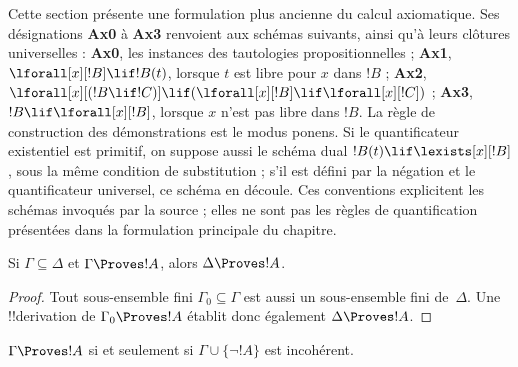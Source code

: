 \documentclass[../../../include/open-logic-section]{subfiles}
\begin{document}
      {}
      {}


\begin{editorial}
Cette section présente une formulation plus ancienne du calcul
axiomatique. Ses désignations \textbf{Ax0} à \textbf{Ax3} renvoient
aux schémas suivants, ainsi qu'à leurs clôtures universelles :
\textbf{Ax0}, les instances des tautologies propositionnelles ;
\textbf{Ax1}, $\lforall[x][!B]\lif !B(t)$, lorsque $t$ est libre
pour $x$ dans $!B$ ;
\textbf{Ax2},
$\lforall[x][(!B\lif !C)]\lif
(\lforall[x][!B]\lif\lforall[x][!C])$ ;
\textbf{Ax3}, $!B\lif\lforall[x][!B]$, lorsque $x$ n'est pas
libre dans $!B$. La règle de construction des démonstrations est
le modus ponens. Si le quantificateur existentiel est primitif,
on suppose aussi le schéma dual
$!B(t)\lif\lexists[x][!B]$, sous la même condition de
substitution ; s'il est défini par la négation et le quantificateur
universel, ce schéma en découle. Ces conventions explicitent
les schémas invoqués
par la source ; elles ne sont pas les règles de quantification
présentées dans la formulation principale du chapitre.
\end{editorial}

\begin{prop}[Monotonie]
Si $\Gamma \subseteq \Delta$ et $\Gamma \Proves !A$, alors
$\Delta \Proves !A$.
\end{prop}

\begin{proof}
Tout sous-ensemble fini $\Gamma_0 \subseteq \Gamma$ est aussi un
sous-ensemble fini de~$\Delta$. Une !!{derivation} de
$\Gamma_0 \Proves !A$ établit donc également
$\Delta \Proves !A$.
\end{proof}

\begin{prop}
$\Gamma \Proves !A$ si et seulement si
$\Gamma\cup \{\lnot!A \}$ est incohérent.
\end{prop}
\end{document}
